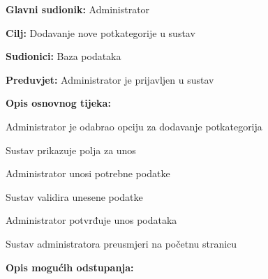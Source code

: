 					\eject

					\noindent {}
					\begin{packed_item}
	
						\item \textbf{Glavni sudionik: }Administrator
						\item  \textbf{Cilj:} Dodavanje nove potkategorije u sustav
						\item  \textbf{Sudionici:} Baza podataka
						\item  \textbf{Preduvjet:} Administrator je prijavljen u sustav
						
						\item  \textbf{Opis osnovnog tijeka:}
						
						\item[] \begin{packed_enum}
							\item Administrator je odabrao opciju za dodavanje potkategorija
							\item Sustav prikazuje polja za unos
							\item Administrator unosi potrebne podatke
							\item Sustav validira unesene podatke
							\item Administrator potvrđuje unos podataka
							\item Sustav administratora preusmjeri na početnu stranicu
						\end{packed_enum}			
						
						\item  \textbf{Opis mogućih odstupanja:}


\end{packed_item}

